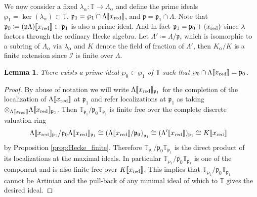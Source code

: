 \documentclass[leqno]{amsart}
\newtheorem{lem}[thm]{Lemma}
\theoremstyle{definition}
\theoremstyle{remark}
\newcommand{\fp}{\mathfrak{p}}
\newcommand{\xx}{x_\textnormal{red}}
\newcommand{\TT}{\mathbb{T}} %
\newcommand{\I}{\mathcal{I}} %
\begin{document}
We now consider a fixed 
$\lambda_\alpha\colon \TT\to \Lambda_\alpha$
and define the prime ideals 
$\wp_1=\ker(\lambda_\alpha)\subset \TT$,
$\fp_1=\wp_1\cap \Lambda\llbracket\xx\rrbracket$, and
$\fp=\fp_1\cap \Lambda$.
Note that $\fp_0\coloneqq (\fp\Lambda)\llbracket\xx\rrbracket\subset \fp_1$
is also a prime ideal.
And in fact $\fp_1=\fp_0+(\xx)$
since $\lambda$ factors through the ordinary Hecke algebra.
Let $\Lambda'\coloneqq \Lambda/\fp$,
which is isomorphic to a subring of $\Lambda_\alpha$ via $\lambda_\alpha$
and $K$ denote the field of fraction of $\Lambda'$,
then $K_\alpha/K$ is a finite extension 
since $\I$ is finite over $\Lambda$.


\begin{lem}\label{lem:smallprime}
There exists a prime ideal 
$\wp_0\subset \wp_1$ of $\TT$ such that 
$\wp_0\cap \Lambda\llbracket \xx\rrbracket=\fp_0$.
\end{lem}
\begin{proof}
By abuse of notation we will write
$\Lambda\llbracket\xx\rrbracket_{\fp_1}$
for the completion of the localization of
$\Lambda\llbracket\xx\rrbracket$ at $\fp_1$
and refer localizations at $\fp_1$ as taking
$\otimes_{\Lambda\llbracket\xx\rrbracket}
\Lambda\llbracket\xx\rrbracket_{\fp_1}$.
Then $\TT_{\fp_1}/\fp_0\TT_{\fp_1}$
is finite free over
the complete discrete valuation ring
\[
\Lambda\llbracket\xx\rrbracket_{\fp_1}/
\fp_0\Lambda\llbracket\xx\rrbracket_{\fp_1}\cong
\left(
\Lambda\llbracket\xx\rrbracket/\fp_0
\right)_{\fp_1}\cong
(\Lambda'\llbracket\xx\rrbracket)_{\fp_1}\cong 
K\llbracket\xx\rrbracket
\]
by Proposition \ref{prop:Hecke_finite}.
Therefore $\TT_{\fp_1}/\fp_0\TT_{\fp_1}$
is the direct product of its localizations at the maximal ideals.
In particular $\TT_{\wp_1}/\fp_0\TT_{\fp_1}$
is one of the component and is also finite free over 
$K\llbracket\xx\rrbracket$.
This implies that $\TT_{\wp_1}/\fp_0\TT_{\fp_1}$ cannot be Artinian
and the pull-back of any minimal ideal of which to $\TT$
gives the desired ideal.

\end{proof}
\end{document}
